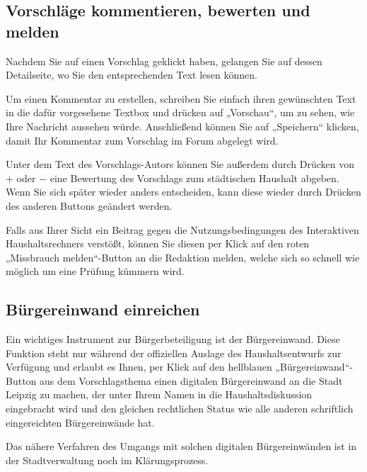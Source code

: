 \documentclass[a4paper,11pt,twoside]{article}
\begin{document}
\subsection{Vorschl\"age kommentieren, bewerten und melden}
Nachdem Sie auf einen Vorschlag geklickt haben, gelangen Sie auf dessen
Detailseite, wo Sie den entsprechenden Text lesen können.

Um einen Kommentar zu erstellen, schreiben Sie einfach ihren gewünschten Text
in die daf\"ur vorgesehene Textbox und dr\"ucken auf „Vorschau“, um zu sehen,
wie Ihre Nachricht aussehen w\"urde. Anschließend können Sie auf „Speichern“
klicken, damit Ihr Kommentar zum Vorschlag im Forum abgelegt wird.

Unter dem Text des Vorschlags-Autors k\"onnen Sie außerdem durch Dr\"ucken von
$+$ oder $-$ eine Bewertung des Vorschlags zum städtischen Haushalt abgeben.
Wenn Sie sich später wieder anders entscheiden, kann diese wieder durch
Dr\"ucken des anderen Buttons ge\"andert werden.

Falls aus Ihrer Sicht ein Beitrag gegen die Nutzungsbedingungen des
Interaktiven Haushaltsrechners verstößt, können Sie diesen per Klick auf den
roten „Missbrauch melden“-Button an die Redaktion melden, welche sich so
schnell wie möglich um eine Prüfung kümmern wird.

\subsection{Bürgereinwand einreichen}

Ein wichtiges Instrument zur Bürgerbeteiligung ist der Bürgereinwand.  Diese
Funktion steht nur während der offiziellen Auslage des Haushaltsentwurfs zur
Verfügung und erlaubt es Ihnen, per Klick auf den hellblauen
„Bürgereinwand“-Button aus dem Vorschlagsthema einen digitalen Bürgereinwand
an die Stadt Leipzig zu machen, der unter Ihrem Namen in die
Haushaltsdiskussion eingebracht wird und den gleichen rechtlichen Status wie
alle anderen schriftlich eingereichten Bürgereinwände hat.

Das nähere Verfahren des Umgangs mit solchen digitalen Bürgereinwänden ist in
der Stadtverwaltung noch im Klärungsprozess.
\end{document}
